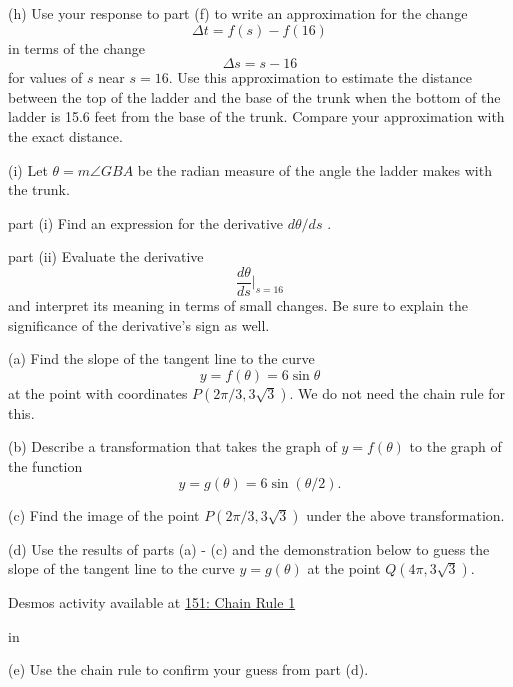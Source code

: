 \documentclass{ximera}
\newcommand{\pskip}{\vskip 0.1 in}
\begin{document}
\begin{question}
(h) Use your response to part (f) to write an approximation for the change
\[
         \Delta t = f(s) - f(16)
\]
in terms of the change 
\[
     \Delta s = s - 16
\]
for values of $s$ near $s=16$. Use this approximation to estimate the distance between the top of the ladder and the base of the trunk when the bottom of the ladder is 15.6 feet from the base of the trunk. Compare your approximation with the exact distance.

(i) Let $\theta = m\angle GBA$ be the radian measure of the angle the ladder makes with the trunk. 

part (i) Find an expression for the derivative $d\theta/ds$ .

part (ii) Evaluate the derivative 
\[
     \frac{d\theta}{ds}\Big|_{s=16}
\]
and interpret its meaning in terms of small changes. Be sure to explain the significance of the derivative's sign as well.

\end{question}


\begin{example}  \label{Ex:CHr34rrer}
(a) Find the slope of the tangent line to the curve
\[
   y = f(\theta) = 6 \sin \theta
\]
at the point with coordinates $P(2\pi/3, 3\sqrt{3})$. We do not need the chain rule for this.

(b) Describe a transformation that takes the graph of $y=f(\theta)$ to the graph of the function
\[
        y = g(\theta) = 6\sin (\theta/2) .
\]

(c) Find the image of the point $P(2\pi/3,3\sqrt{3})$ under the above transformation.

(d) Use the results of parts (a) - (c) and the demonstration below to guess the slope of the tangent line to the curve $y=g(\theta)$ at the point $Q(4\pi,3\sqrt{3})$.

\begin{onlineOnly}
    \begin{center}
\end{center}
\end{onlineOnly}

Desmos activity available at \href{https://www.desmos.com/calculator/mqjxpsqyo5}{151: Chain Rule 1}

\pskip

(e) Use the chain rule to confirm your guess from part (d).

\end{example}
\end{document}
